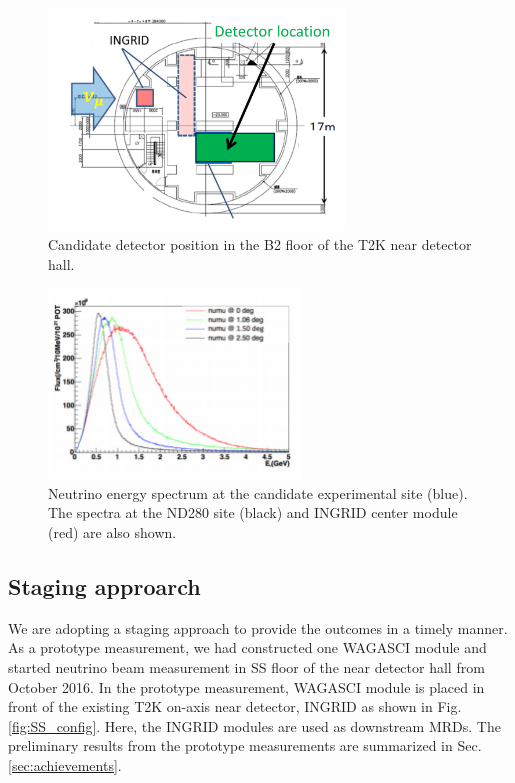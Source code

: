 \begin{figure}%
  \begin{center}
  \includegraphics[width=0.7\textwidth]{figs/detector_position_b2.pdf}
  \caption{Candidate detector position in the B2 floor of the T2K near detector hall.}
  \label{fig:detector_position_b2}
  \end{center}
\end{figure}

\begin{figure}%
  \begin{center}
  \includegraphics[width=0.6\textwidth]{figs/nu_flux_b2.pdf}
  \caption{Neutrino energy spectrum at the candidate experimental site (blue). 
  The spectra at the ND280 site (black) and INGRID center module (red) are also shown.}
  \label{fig:nu_flux_b2}
  \end{center}
\end{figure}


\subsection{Staging approarch}
We are adopting a staging approach to provide the outcomes in a timely manner.
As a prototype measurement, we had constructed one WAGASCI module and started neutrino beam measurement in SS floor of the near detector hall from October 2016.
In the prototype measurement, WAGASCI module is placed in front of the existing T2K on-axis near detector, INGRID as shown in Fig. \ref{fig:SS_config}.
Here, the INGRID modules are used as downstream MRDs.
The preliminary results from the prototype measurements are summarized in Sec. \ref{sec:achievements}.

